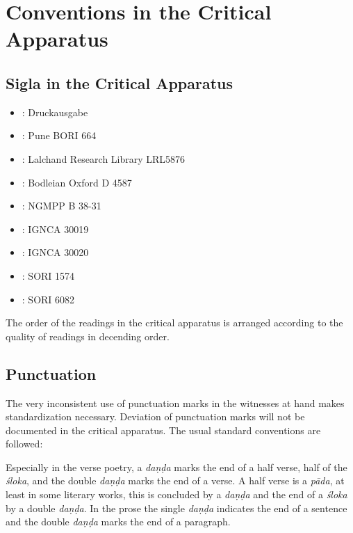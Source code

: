 \documentclass[11pt,showtrims]{memoir}
\begin{document}
\chapter{Conventions in the Critical Apparatus}
\section{Sigla in the Critical Apparatus}
\begin{itemize}
\item \edprint : Druckausgabe
\item \pune : Pune BORI 664
\item \lalchand : Lalchand Research Library LRL5876
\item \oxford : Bodleian Oxford D 4587
\item \nepal : NGMPP B 38-31
\item \dehlia: IGNCA 30019
\item \dehlib: IGNCA 30020
\item \ujjaina: SORI 1574
\item \ujjainb: SORI 6082
\end{itemize}

The order of the readings in the critical apparatus is arranged according to the quality of readings in decending order.  

\section{Punctuation}

The very inconsistent use of punctuation marks in the witnesses at hand makes standardization necessary. Deviation of punctuation marks will not be documented in the critical apparatus. The usual standard conventions are followed:

Especially in the verse poetry, a \textit{daṇḍa} marks the end of a half verse, half of the \textit{śloka}, and the double \textit{daṇḍa} marks the end of a verse. A half verse is a \textit{pāda}, at least in some literary works, this is concluded by a \textit{daṇḍa} and the end of a \textit{śloka} by a double \textit{daṇḍa}. In the prose the single \textit{daṇḍa} indicates the end of a sentence and the double \textit{daṇḍa} marks the end of a paragraph.
\end{document}
